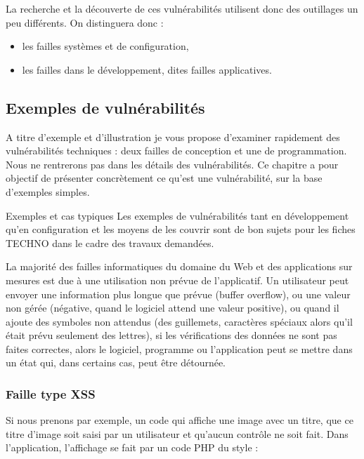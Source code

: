 La recherche et la découverte de ces vulnérabilités utilisent donc des outillages un peu différents. On distinguera donc : 

\begin{itemize}
  \item les failles systèmes et de configuration,
  \item les failles dans le développement, dites failles applicatives.
 \end{itemize}

\subsection{Exemples de vulnérabilités}

A titre d'exemple et d'illustration je vous propose d'examiner rapidement des vulnérabilités techniques : deux failles de conception  et  une de programmation.
Nous ne rentrerons pas dans les détails des vulnérabilités. Ce chapitre a pour objectif de présenter concrètement ce qu'est une vulnérabilité, sur la base d'exemples simples.

\begin{warningbox}{Exemples et cas typiques}
Les exemples de vulnérabilités tant en développement qu'en configuration et les moyens de les couvrir sont de bon sujets pour les fiches TECHNO dans le cadre des travaux demandées.
\end{warningbox}


La  majorité des failles informatiques du domaine du Web et des applications sur mesures est due à une utilisation non prévue de l'applicatif. Un utilisateur peut envoyer une information plus longue que prévue (buffer overflow), ou une valeur non gérée (négative, quand le logiciel attend une valeur positive), ou quand il ajoute des symboles non attendus (des guillemets, caractères spéciaux alors qu'il était prévu seulement des lettres), si les vérifications des données ne sont pas faites correctes, alors le logiciel, programme ou l’application peut se mettre dans un état qui, dans certains cas, peut être détournée.

\subsubsection{Faille type XSS}

Si nous prenons par exemple, un code qui affiche une image avec un titre, que ce titre d'image soit saisi par un utilisateur et qu'aucun contrôle ne soit fait. Dans l'application, l'affichage se fait par un code PHP du style : \\


